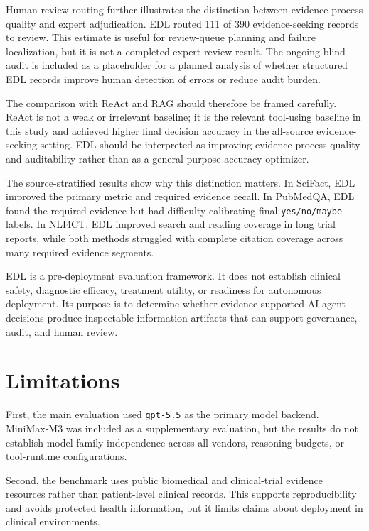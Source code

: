 \documentclass[11pt,a4paper]{article}
\begin{document}
Human review routing further illustrates the distinction between evidence-process quality and expert adjudication. EDL routed 111 of 390 evidence-seeking records to review. This estimate is useful for review-queue planning and failure localization, but it is not a completed expert-review result. The ongoing blind audit is included as a placeholder for a planned analysis of whether structured EDL records improve human detection of errors or reduce audit burden.

The comparison with ReAct and RAG should therefore be framed carefully. ReAct is not a weak or irrelevant baseline; it is the relevant tool-using baseline in this study and achieved higher final decision accuracy in the all-source evidence-seeking setting. EDL should be interpreted as improving evidence-process quality and auditability rather than as a general-purpose accuracy optimizer.

The source-stratified results show why this distinction matters. In SciFact, EDL improved the primary metric and required evidence recall. In PubMedQA, EDL found the required evidence but had difficulty calibrating final \texttt{yes/no/maybe} labels. In NLI4CT, EDL improved search and reading coverage in long trial reports, while both methods struggled with complete citation coverage across many required evidence segments.

EDL is a pre-deployment evaluation framework. It does not establish clinical safety, diagnostic efficacy, treatment utility, or readiness for autonomous deployment. Its purpose is to determine whether evidence-supported AI-agent decisions produce inspectable information artifacts that can support governance, audit, and human review.

\section{Limitations}

First, the main evaluation used \texttt{gpt-5.5} as the primary model backend. MiniMax-M3 was included as a supplementary evaluation, but the results do not establish model-family independence across all vendors, reasoning budgets, or tool-runtime configurations.

Second, the benchmark uses public biomedical and clinical-trial evidence resources rather than patient-level clinical records. This supports reproducibility and avoids protected health information, but it limits claims about deployment in clinical environments.
\end{document}
